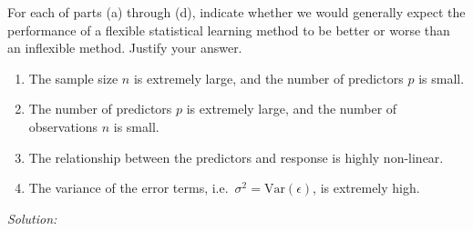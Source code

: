 \documentclass[11pt,a4paper]{article}
\newif\ifsolucoes
\newcommand{\espacoresol}{3.5cm}   %
\numberwithin{equation}{questao}   %
\newcommand{\resolespaco}{\ifsolucoes\else\par\textit{Solution:}\vspace{\espacoresol}\par\fi}
\begin{document}
For each of parts (a) through (d), indicate whether we would generally expect the performance of
a flexible statistical learning method to be better or worse than an inflexible method. Justify
your answer.
\begin{enumerate}[label=(\alph*)]
\item The sample size $n$ is extremely large, and the number of predictors $p$ is small.
\item The number of predictors $p$ is extremely large, and the number of observations $n$ is small.
\item The relationship between the predictors and response is highly non-linear.
\item The variance of the error terms, i.e.\ $\sigma^2 = \mathrm{Var}(\epsilon)$, is extremely high.
\end{enumerate}
\resolespaco
\end{document}
